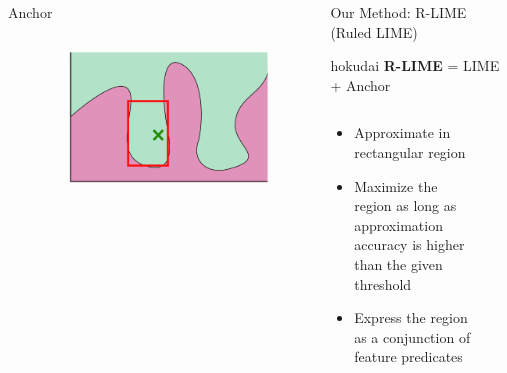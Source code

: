 \documentclass[unicode]{beamer}
\begin{document}
\begin{frame}
\begin{columns}[t]
\begin{column}{\lcol\linewidth}
\begin{block}{Anchor}
\begin{columns}
\begin{column}{.65\textwidth}
{						}
					\end{column}
					\begin{column}{.35\textwidth}
						\begin{figure}
							\centering
							\includegraphics[width=.8\textwidth]{src/img/visual-anchor}
						\end{figure}
					\end{column}
				\end{columns}
			\end{block}
		\end{column}
		\begin{column}{\rcol\linewidth}%
			\begin{block}{Our Method: R-LIME (Ruled LIME)}
				\hspace{0px}
				\begin{beamercolorbox}[wd=.35\textwidth,colsep=.4em,rounded=true,shadow=true]{hokudai}
					\textbf{R-LIME} = LIME + Anchor
				\end{beamercolorbox}
				\vspace{.2em}
				\begin{columns}
					\begin{column}{0.66\textwidth}
						\begin{itemize}
							\item Approximate in rectangular region
							\item Maximize the region as long as approximation accuracy is
							      higher than the given threshold
							\item Express the region as a conjunction of feature predicates \\[0.5em]
						\end{itemize}
					\end{column}
					\begin{column}{0.27\textwidth}
						\begin{figure}

\end{figure}
\end{column}
\end{columns}
\end{block}
\end{column}
\end{columns}
\end{frame}
\end{document}
